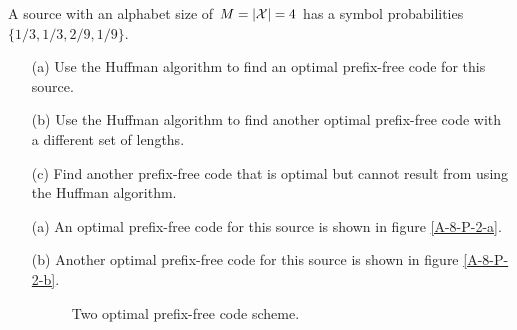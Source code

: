 \documentclass{assignment}
\begin{document}
\begin{prob}[2.12]
    A source with an alphabet size of $M=\left\lvert\mathcal{X}\right\rvert=4$ has a symbol probabilities $\{1/3,1/3,2/9,1/9\}$.
    \begin{itemize}
        \item[(a)] Use the Huffman algorithm to find an optimal prefix-free code for this source.
        \item[(b)] Use the Huffman algorithm to find another optimal prefix-free code with a different set of lengths.
        \item[(c)] Find another prefix-free code that is optimal but cannot result from using the Huffman algorithm.
    \end{itemize}
\end{prob}
\begin{sol}
    \begin{itemize}
        Suppose the four symbols corresponding to the probabilities $\{1/3,1/3,2/9,1/9\}$ are a,b,c,d.
        \item[(a)] An optimal prefix-free code for this source is shown in figure \ref{A-8-P-2-a}.
        \item[(b)] Another optimal prefix-free code for this source is shown in figure \ref{A-8-P-2-b}.
        \begin{figure}[h]
            \centering
            \caption{Two optimal prefix-free code scheme.}
        \end{figure}

\end{itemize}
\end{sol}
\end{document}
